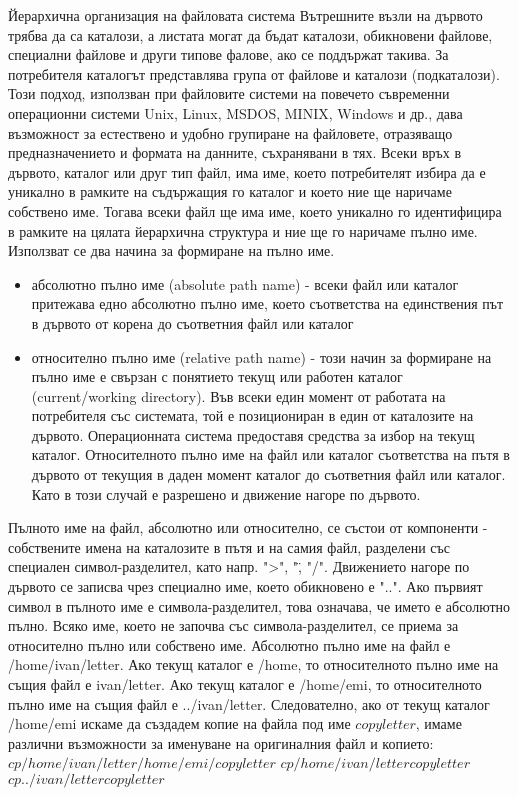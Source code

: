 \documentclass{article}
\begin{document}
Йерархична организация на файловата система \newline
Вътрешните възли на дървото трябва да са каталози, а листата могат да бъдат каталози, обикновени файлове, специални файлове и
други типове фалове, ако се поддържат такива. За потребителя каталогът представлява група от файлове и каталози (подкаталози).
Този подход, използван при файловите системи на повечето съвременни операционни системи Unix, Linux, MSDOS, MINIX, Windows и др.,
дава възможност за естествено и удобно групиране на файловете, отразяващо предназначението и формата на данните, съхранявани в тях.
Всеки връх в дървото, каталог или друг тип файл, има име, което потребителят избира да е уникално в рамките на съдържащия го
каталог и което ние ще наричаме собствено име. Тогава всеки файл ще има име, което уникално го идентифицира в рамките на цялата
йерархична структура и ние ще го наричаме пълно име. Използват се два начина за формиране на пълно име.
\begin{itemize}
    \item абсолютно пълно име (absolute path name) - всеки файл или каталог притежава едно абсолютно пълно име, което съответства
    на единствения път в дървото от корена до съответния файл или каталог
    \item относително пълно име (relative path name) - този начин за формиране на пълно име е свързан с понятието текущ или
    работен каталог (current/working directory). Във всеки един момент от работата на потребителя със системата, той е
    позициониран в един от каталозите на дървото. Операционната система предоставя средства за избор на текущ каталог.
    Относителното пълно име на файл или каталог съответства на пътя в дървото от текущия в даден момент каталог до съответния
    файл или каталог. Като в този случай е разрешено и движение нагоре по дървото.
\end{itemize}
Пълното име на файл, абсолютно или относително, се състои от компоненти - собствените имена на каталозите в пътя и на самия файл,
разделени със специален символ-разделител, като напр. ">", "\", "/". Движението нагоре по дървото се записва чрез специално име,
което обикновено е "..". Ако първият символ в пълното име е символа-разделител, това означава, че името е абсолютно пълно. Всяко
име, което не започва със символа-разделител, се приема за относително пълно или собствено име. Абсолютно пълно име на файл е
/home/ivan/letter. Ако текущ каталог е /home, то относителното пълно име на същия файл е ivan/letter. Ако текущ каталог е
/home/emi, то относителното пълно име на същия файл е ../ivan/letter. Следователно, ако от текущ каталог /home/emi искаме да
създадем копие на файла под име $copyletter$, имаме различни възможности за именуване на оригиналния файл и копието: \newline
$ cp /home/ivan/letter /home/emi/copyletter $ \newline
$ cp /home/ivan/letter copyletter $ \newline
$ cp ../ivan/letter copyletter $
\end{document}
